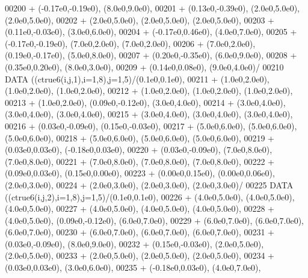 \begin{DoxyCode}
00200      +                  (-0.17e0,-0.19e0), (8.0e0,9.0e0),
00201      +                  (0.13e0,-0.39e0), (2.0e0,5.0e0), (2.0e0,5.0e0),
00202      +                  (2.0e0,5.0e0), (2.0e0,5.0e0), (2.0e0,5.0e0),
00203      +                  (0.11e0,-0.03e0), (3.0e0,6.0e0),
00204      +                  (-0.17e0,0.46e0), (4.0e0,7.0e0),
00205      +                  (-0.17e0,-0.19e0), (7.0e0,2.0e0), (7.0e0,2.0e0),
00206      +                  (7.0e0,2.0e0), (0.19e0,-0.17e0), (5.0e0,8.0e0),
00207      +                  (0.20e0,-0.35e0), (6.0e0,9.0e0),
00208      +                  (0.35e0,0.20e0), (8.0e0,3.0e0),
00209      +                  (0.14e0,0.08e0), (9.0e0,4.0e0)/
00210       \textcolor{keyword}{DATA}              ((ctrue6(i,j,1),i=1,8),j=1,5)/(0.1e0,0.1e0),
00211      +                  (1.0e0,2.0e0), (1.0e0,2.0e0), (1.0e0,2.0e0),
00212      +                  (1.0e0,2.0e0), (1.0e0,2.0e0), (1.0e0,2.0e0),
00213      +                  (1.0e0,2.0e0), (0.09e0,-0.12e0), (3.0e0,4.0e0),
00214      +                  (3.0e0,4.0e0), (3.0e0,4.0e0), (3.0e0,4.0e0),
00215      +                  (3.0e0,4.0e0), (3.0e0,4.0e0), (3.0e0,4.0e0),
00216      +                  (0.03e0,-0.09e0), (0.15e0,-0.03e0),
00217      +                  (5.0e0,6.0e0), (5.0e0,6.0e0), (5.0e0,6.0e0),
00218      +                  (5.0e0,6.0e0), (5.0e0,6.0e0), (5.0e0,6.0e0),
00219      +                  (0.03e0,0.03e0), (-0.18e0,0.03e0),
00220      +                  (0.03e0,-0.09e0), (7.0e0,8.0e0), (7.0e0,8.0e0),
00221      +                  (7.0e0,8.0e0), (7.0e0,8.0e0), (7.0e0,8.0e0),
00222      +                  (0.09e0,0.03e0), (0.15e0,0.00e0),
00223      +                  (0.00e0,0.15e0), (0.00e0,0.06e0), (2.0e0,3.0e0),
00224      +                  (2.0e0,3.0e0), (2.0e0,3.0e0), (2.0e0,3.0e0)/
00225       \textcolor{keyword}{DATA}              ((ctrue6(i,j,2),i=1,8),j=1,5)/(0.1e0,0.1e0),
00226      +                  (4.0e0,5.0e0), (4.0e0,5.0e0), (4.0e0,5.0e0),
00227      +                  (4.0e0,5.0e0), (4.0e0,5.0e0), (4.0e0,5.0e0),
00228      +                  (4.0e0,5.0e0), (0.09e0,-0.12e0), (6.0e0,7.0e0),
00229      +                  (6.0e0,7.0e0), (6.0e0,7.0e0), (6.0e0,7.0e0),
00230      +                  (6.0e0,7.0e0), (6.0e0,7.0e0), (6.0e0,7.0e0),
00231      +                  (0.03e0,-0.09e0), (8.0e0,9.0e0),
00232      +                  (0.15e0,-0.03e0), (2.0e0,5.0e0), (2.0e0,5.0e0),
00233      +                  (2.0e0,5.0e0), (2.0e0,5.0e0), (2.0e0,5.0e0),
00234      +                  (0.03e0,0.03e0), (3.0e0,6.0e0),
00235      +                  (-0.18e0,0.03e0), (4.0e0,7.0e0),

\end{DoxyCode}
